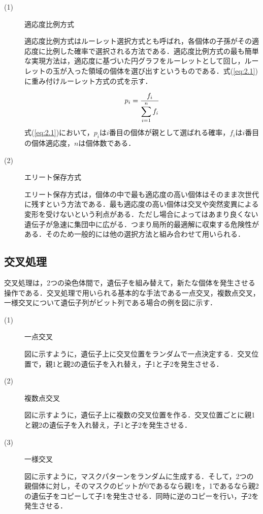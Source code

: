\begin{description}
\item[ (1) ]適応度比例方式

適応度比例方式はルーレット選択方式とも呼ばれ，各個体の子孫がその適応度に比例した確率で選択される方法である．適応度比例方式の最も簡単な実現方法は，適応度に基づいた円グラフをルーレットとして回し，ルーレットの玉が入った領域の個体を選び出すというものである．式(\ref{eq:2.1})に重み付けルーレット方式の式を示す．



\begin{equation}
\vspace{1.0cm}
{p_i}=\frac{f_i}{\displaystyle\sum_{i=1}^{n}f_i}
\label{eq:2.1}
\vspace{-0.5cm}
\end{equation}
式(\ref{eq:2.1})において，$p_i$は$i$番目の個体が親として選ばれる確率，$f_i$は$i$番目の個体適応度，$n$は個体数である．

\item[ (2) ]エリート保存方式

エリート保存方式は，個体の中で最も適応度の高い個体はそのまま次世代に残すという方法である．最も適応度の高い個体は交叉や突然変異による変形を受けないという利点がある．ただし場合によってはあまり良くない遺伝子が急速に集団中に広がる．つまり局所的最適解に収束する危険性がある．そのため一般的には他の選択方法と組み合わせて用いられる．

\end{description}

\subsection{交叉処理}
\label{sec2.1.4}

交叉処理は，2つの染色体間で，遺伝子を組み替えて，新たな個体を発生させる操作である．交叉処理で用いられる基本的な手法である一点交叉，複数点交叉，一様交叉について遺伝子列がビット列である場合の例を図に示す．
%
\newpage

\begin{description}
\item[ (1) ]一点交叉

図に示すように，遺伝子上に交叉位置をランダムで一点決定する．交叉位置で，親1と親2の遺伝子を入れ替え，子1と子2を発生させる．

\item[ (2) ]複数点交叉

図に示すように，遺伝子上に複数の交叉位置を作る．交叉位置ごとに親1と親2の遺伝子を入れ替え，子1と子2を発生させる．

\item[ (3) ]一様交叉

図に示すように，マスクパターンをランダムに生成する．そして，2つの親個体に対し，そのマスクのビットが0であるなら親1を，1であるなら親2の遺伝子をコピーして子1を発生させる．同時に逆のコピーを行い，子2を発生させる．

\end{description}

